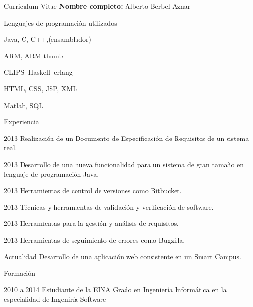 \begin{cv}{Curriculum Vitae}
\vspace{1cm}
\textbf{Nombre completo:} Alberto Berbel Aznar
\vspace{1cm}

\begin{cvlist}{Lenguajes de programaci\'on utilizados}
\item Java, C, C++,(ensamblador)
\item ARM, ARM thumb
\item CLIPS, Haskell, erlang
\item HTML, CSS, JSP, XML
\item Matlab, SQL
\end{cvlist}

\begin{cvlist}{Experiencia}

	\item[2013] Realizaci\'on de un Documento de Especificaci\'on de Requisitos 
				de un sistema real.
	
	\item[2013] Desarrollo de una nueva funcionalidad para un sistema de gran 
				tama\~no en lenguaje de programaci\'on Java.
	
	\item[2013] Herramientas de control de versiones como Bitbucket.
	
	\item[2013] T\'ecnicas y herramientas de validaci\'on y verificaci\'on de software.
	
	\item[2013] Herramientas para la gesti\'on y an\'alisis de requisitos.
	
	\item[2013] Herramientas de seguimiento de errores como Bugzilla.
	
	\item[Actualidad] Desarrollo de una aplicaci\'on web consistente en un Smart Campus.

\end{cvlist}

\begin{cvlist}{Formaci\'on}

	\item[2010 a 2014] Estudiante de la EINA
		Grado en Ingenier\'ia Inform\'atica en la especialidad de Ingenir\'ia Software


\end{cvlist}

\end{cv}